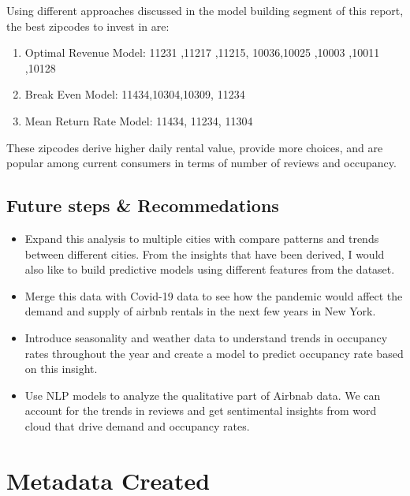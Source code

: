 \documentclass[
]{article}
\begin{document}
Using different approaches discussed in the model building segment of
this report, the best zipcodes to invest in are:

\begin{enumerate}
\def\labelenumi{\arabic{enumi}.}
\item
  Optimal Revenue Model: 11231 ,11217 ,11215, 10036,10025 ,10003 ,10011
  ,10128
\item
  Break Even Model: 11434,10304,10309, 11234
\item
  Mean Return Rate Model: 11434, 11234, 11304
\end{enumerate}

These zipcodes derive higher daily rental value, provide more choices,
and are popular among current consumers in terms of number of reviews
and occupancy.

\hypertarget{future-steps-recommedations}{%
\subsection{Future steps \&
Recommedations}\label{future-steps-recommedations}}

\begin{itemize}
\item
  Expand this analysis to multiple cities with compare patterns and
  trends between different cities. From the insights that have been
  derived, I would also like to build predictive models using different
  features from the dataset.
\item
  Merge this data with Covid-19 data to see how the pandemic would
  affect the demand and supply of airbnb rentals in the next few years
  in New York.
\item
  Introduce seasonality and weather data to understand trends in
  occupancy rates throughout the year and create a model to predict
  occupancy rate based on this insight.
\item
  Use NLP models to analyze the qualitative part of Airbnab data. We can
  account for the trends in reviews and get sentimental insights from
  word cloud that drive demand and occupancy rates.
\end{itemize}

\hypertarget{metadata-created}{%
\section{Metadata Created}\label{metadata-created}}
\end{document}
